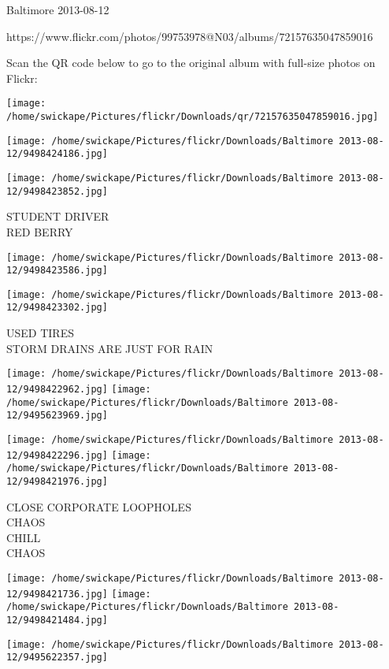 \documentclass[10pt,letterpaper]{article}
\begin{document}
Baltimore 2013-08-12

https://www.flickr.com/photos/99753978@N03/albums/72157635047859016

Scan the QR code below to go to the original album with full-size photos on Flickr:

\texttt{[image: /home/swickape/Pictures/flickr/Downloads/qr/72157635047859016.jpg]}
\pagebreak

\texttt{[image: /home/swickape/Pictures/flickr/Downloads/Baltimore 2013-08-12/9498424186.jpg]}

\vspace{0.25in}
\texttt{[image: /home/swickape/Pictures/flickr/Downloads/Baltimore 2013-08-12/9498423852.jpg]}

STUDENT DRIVER\\
RED BERRY\\
\pagebreak

\texttt{[image: /home/swickape/Pictures/flickr/Downloads/Baltimore 2013-08-12/9498423586.jpg]}

\vspace{0.25in}
\texttt{[image: /home/swickape/Pictures/flickr/Downloads/Baltimore 2013-08-12/9498423302.jpg]}

USED TIRES\\
STORM DRAINS ARE JUST FOR RAIN\\
\pagebreak

\texttt{[image: /home/swickape/Pictures/flickr/Downloads/Baltimore 2013-08-12/9498422962.jpg]}
\texttt{[image: /home/swickape/Pictures/flickr/Downloads/Baltimore 2013-08-12/9495623969.jpg]}

\texttt{[image: /home/swickape/Pictures/flickr/Downloads/Baltimore 2013-08-12/9498422296.jpg]}
\texttt{[image: /home/swickape/Pictures/flickr/Downloads/Baltimore 2013-08-12/9498421976.jpg]}

CLOSE CORPORATE LOOPHOLES\\
CHAOS\\
CHILL\\
CHAOS\\
\pagebreak

\texttt{[image: /home/swickape/Pictures/flickr/Downloads/Baltimore 2013-08-12/9498421736.jpg]}
\texttt{[image: /home/swickape/Pictures/flickr/Downloads/Baltimore 2013-08-12/9498421484.jpg]}

\texttt{[image: /home/swickape/Pictures/flickr/Downloads/Baltimore 2013-08-12/9495622357.jpg]}
\end{document}
